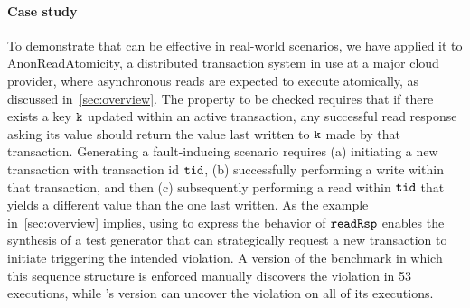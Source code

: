 \paragraph{Case study}
To demonstrate that \name{} can be effective in real-world scenarios,
we have applied it to \textsf{AnonReadAtomicity}, a distributed
transaction system in use at a major cloud provider, where
asynchronous reads are expected to execute atomically, as discussed
in~\autoref{sec:overview}. The property to be checked requires that if
there exists a key ${\tt k}$ updated within an active transaction,
any successful read response asking its value should return the value
last written to ${\tt k}$ made by that transaction.
Generating a fault-inducing scenario requires (a) initiating a new
transaction with transaction id ${\tt tid}$, (b) successfully
performing a write within that transaction, and then (c) subsequently
performing a read within ${\tt tid}$ that yields a different value
than the one last written.  As the example in~\ref{sec:overview}
implies, using \tyName{} to express the behavior of $\boldsymbol{{\tt readRsp}}$
enables the synthesis of a test generator that can strategically
request a new transaction to initiate triggering the intended
violation.  A version of the benchmark in which this sequence
structure is enforced manually discovers the violation in 53
executions, while \name{}'s version can uncover the violation on all
of its executions.
